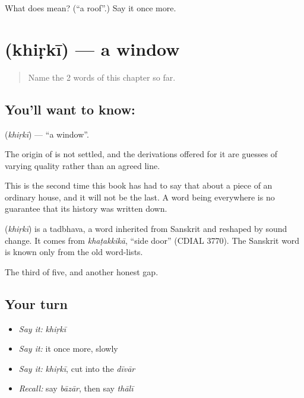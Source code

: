 \begin{tcolorbox}[breakable,colback=teal!4,colframe=teal!35!black,title={Before you move on}]
What does  mean? (\textquotedblleft{}a roof\textquotedblright{}.) Say it once more.
\end{tcolorbox}
\section[\texorpdfstring{\hi{खिड़की} (khiṛkī)}{खिड़की (khiṛkī)}]{ (khiṛkī) — a window}

\label{lesson:HI-C58-window}



\begin{quote}
Name the 2 words of this chapter so far.
\end{quote}

\subsection*{You'll want to know: }
\textbf{} (\emph{khiṛkī}) — \textquotedblleft{}a window\textquotedblright{}.

The origin of  is not settled, and the derivations offered for it are guesses of varying quality rather than an agreed line.

This is the second time this book has had to say that about a piece of an ordinary house, and it will not be the last. A word being everywhere is no guarantee that its history was written down.

\begin{cousinweb}
\textbf{} (\emph{khiṛkī}) is a tadbhava, a word inherited from Sanskrit and reshaped by sound change. It comes from \emph{khaṭakkikā}, \textquotedblleft{}side door\textquotedblright{} (CDIAL 3770). The Sanskrit word is known only from the old word-lists.
\end{cousinweb}

\begin{grammarlens}[title={What you've built}]
The third of five, and another honest gap.
\end{grammarlens}

\subsection*{Your turn}
\begin{itemize}
\raggedright
  \item \emph{Say it:} \emph{khiṛkī}
  \item \emph{Say it:} it once more, slowly
  \item \emph{Say it:} \emph{khiṛkī}, cut into the \emph{dīvār}
  \item \emph{Recall:} say \emph{bāzār}, then say \emph{thālī}
\end{itemize}

